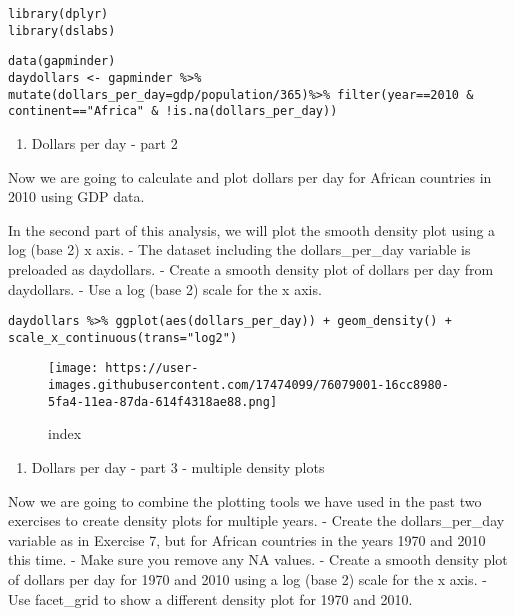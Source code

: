 \documentclass[]{article}
\providecommand{\tightlist}{%
  \setlength{\itemsep}{0pt}\setlength{\parskip}{0pt}}
\begin{document}
\begin{verbatim}
library(dplyr)
library(dslabs)
\end{verbatim}

\begin{verbatim}
data(gapminder)
daydollars <- gapminder %>% mutate(dollars_per_day=gdp/population/365)%>% filter(year==2010 & continent=="Africa" & !is.na(dollars_per_day))
\end{verbatim}

\begin{enumerate}
\def\labelenumi{\arabic{enumi}.}
\setcounter{enumi}{7}
\tightlist
\item
  Dollars per day - part 2
\end{enumerate}

Now we are going to calculate and plot dollars per day for African
countries in 2010 using GDP data.

In the second part of this analysis, we will plot the smooth density
plot using a log (base 2) x axis. - The dataset including the
dollars\_per\_day variable is preloaded as daydollars. - Create a smooth
density plot of dollars per day from daydollars. - Use a log (base 2)
scale for the x axis.

\begin{verbatim}
daydollars %>% ggplot(aes(dollars_per_day)) + geom_density() + scale_x_continuous(trans="log2")
\end{verbatim}

\begin{figure}
\centering
\texttt{[image: https://user-images.githubusercontent.com/17474099/76079001-16cc8980-5fa4-11ea-87da-614f4318ae88.png]}
\caption{index}
\end{figure}

\begin{enumerate}
\def\labelenumi{\arabic{enumi}.}
\setcounter{enumi}{8}
\tightlist
\item
  Dollars per day - part 3 - multiple density plots
\end{enumerate}

Now we are going to combine the plotting tools we have used in the past
two exercises to create density plots for multiple years. - Create the
dollars\_per\_day variable as in Exercise 7, but for African countries
in the years 1970 and 2010 this time. - Make sure you remove any NA
values. - Create a smooth density plot of dollars per day for 1970 and
2010 using a log (base 2) scale for the x axis. - Use facet\_grid to
show a different density plot for 1970 and 2010.
\end{document}
